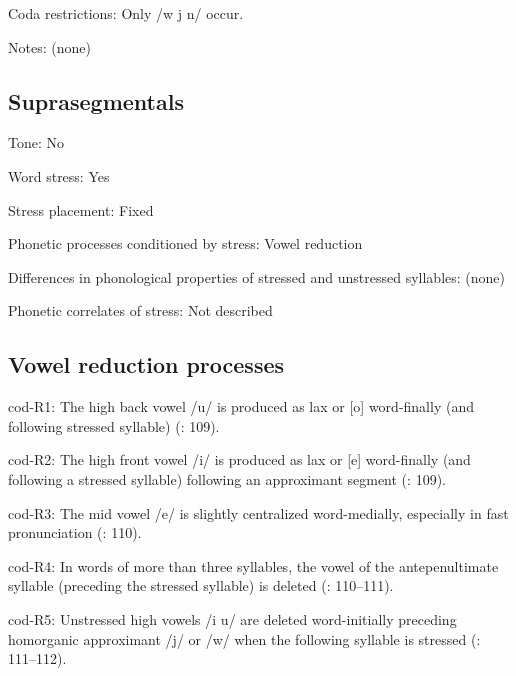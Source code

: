 {\begin{appendixdesc}
\item[Coda restrictions:] Only /w j n/ occur.

\item[Notes:] (none)
\end{appendixdesc}
\subsection*{Suprasegmentals}
\begin{appendixdesc}
\item[Tone:] No

\item[Word stress:] Yes

\item[Stress placement:] Fixed

\item[Phonetic processes conditioned by stress:] Vowel reduction

\item[Differences in phonological properties of stressed and unstressed syllables:] (none)

\item[Phonetic correlates of stress:] Not described
\end{appendixdesc}
\subsection*{Vowel reduction processes}
\begin{appendixdesc}

\item[cod-R1:] The high back vowel /u/ is produced as lax or [o] word-finally (and following stressed syllable) (\citealt{VallejosYopán2010}: 109).

\item[cod-R2:] The high front vowel /i/ is produced as lax or [e] word-finally (and following a stressed syllable) following an approximant segment (\citealt{VallejosYopán2010}: 109).

\item[cod-R3:] The mid vowel /e/ is slightly centralized word-medially, especially in fast pronunciation (\citealt{VallejosYopán2010}: 110).

\item[cod-R4:] In words of more than three syllables, the vowel of the antepenultimate syllable (preceding the stressed syllable) is deleted (\citealt{VallejosYopán2010}: 110--111).

\item[cod-R5:] Unstressed high vowels /i u/ are deleted word-initially preceding homorganic approximant /j/ or /w/ when the following syllable is stressed (\citealt{VallejosYopán2010}: 111--112).
\end{appendixdesc}
}
